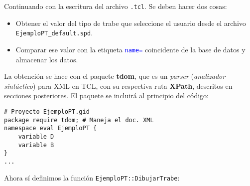\documentclass[10pt, a4paper, twocolumn]{article} %
\begin{document}
Continuando con la escritura del archivo \texttt{.tcl}. Se deben hacer dos cosas:

\begin{itemize}
	\item Obtener el valor del tipo de trabe que seleccione el usuario desde el archivo \texttt{EjemploPT\_default.spd}.
	\item Comparar ese valor con la etiqueta \textcolor{blue}{\texttt{name=}} coincidente de la base de datos y almacenar los datos.
\end{itemize}

La obtención se hace con el paquete \textbf{tdom}, que es un \textit{parser} (\textit{analizador sintáctico}) para XML en TCL, con su respectiva ruta \textbf{XPath}, descritos en secciones posteriores. El paquete se incluirá al principio del código:

\lstset{language=tcl} 
\begin{lstlisting}[caption={Código para inicializar el proyecto y crear el menú.}]
# Proyecto EjemploPT.gid
package require tdom; # Maneja el doc. XML
namespace eval EjemploPT {
	variable D
	variable B
}
...
\end{lstlisting}

Ahora sí definimos la función \texttt{EjemploPT::DibujarTrabe}:
\end{document}

